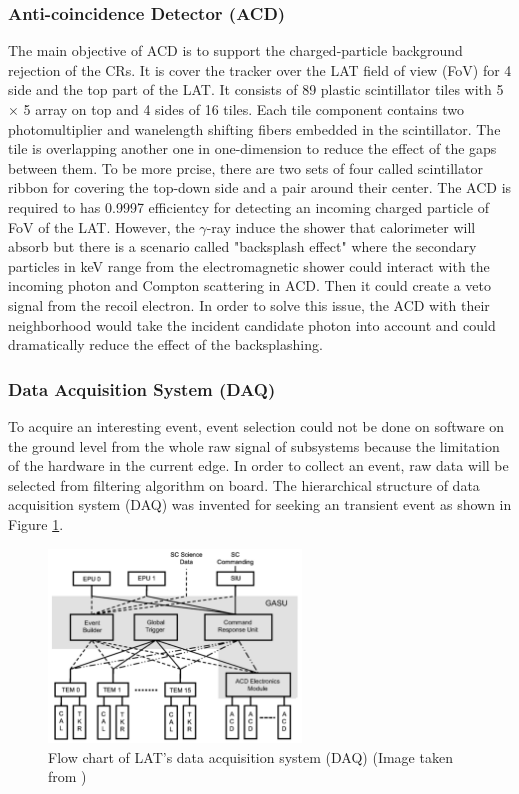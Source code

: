 \subsubsection{Anti-coincidence Detector (ACD)}
The main objective of ACD is to support the charged-particle background 
rejection of the CRs. It is cover the tracker over the LAT field of 
view (FoV) for 4 side and the top part of the LAT. It consists of 
89 plastic scintillator tiles with 5 $\times$ 5 array on top and 
4 sides of 16 tiles. Each tile component contains two photomultiplier 
and wanelength shifting fibers embedded in the scintillator. The tile 
is overlapping another one in one-dimension to reduce the effect of 
the gaps between them. To be more prcise, there are two sets 
of four called scintillator ribbon for covering the top-down side 
and a pair around their center. The ACD is required to has 0.9997 efficientcy 
for detecting an incoming charged particle of FoV of the LAT. However,
the $\gamma$-ray induce the shower that calorimeter will absorb but 
there is a scenario called "backsplash effect" where the secondary 
particles in keV range from the electromagnetic shower could interact 
with the incoming photon and Compton scattering in ACD. Then it could 
create a veto signal from the recoil electron. In order to solve this issue,
the ACD with their neighborhood would take the incident candidate photon 
into account and could dramatically reduce the effect of the backsplashing.


\subsubsection{Data Acquisition System (DAQ)}


To acquire an interesting event, event selection could not be done 
on software on the ground level from the whole raw signal of subsystems because the limitation 
of the hardware in the current edge. In order to collect an event, 
raw data will be selected from filtering algorithm on board.
The hierarchical structure of data acquisition system (DAQ) was invented 
for seeking an transient event as shown in Figure \ref{fig:fermi_daq}.

\begin{figure}[h]
    \centering
    \includegraphics[width=0.6\textwidth]{content/background/figures/fermi_daq.png}
    \caption{Flow chart of LAT's data acquisition system (DAQ) (Image taken from \cite{FermiLAT})}
    \label{fig:fermi_daq}
\end{figure}

